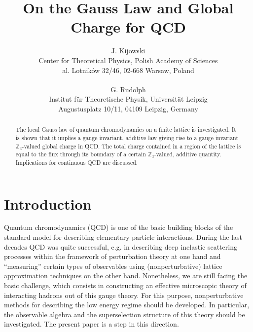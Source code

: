 \documentclass[a4paper,12pt]{article}
\begin{document}

\title{\bf On the Gauss Law and Global Charge for
QCD}

\author{
    J. Kijowski \\
    Center for Theoretical  Physics, Polish Academy of Sciences\\
    al. Lotnik\'ow 32/46, 02-668 Warsaw, Poland\\
    \ \\
    G. Rudolph \\
    Institut f\"ur Theoretische Physik, Universit\"at Leipzig\\
    Augustusplatz 10/11, 04109 Leipzig, Germany\\
    }

\maketitle



\begin{abstract}
The local Gauss law of quantum chromodynamics on a finite lattice
is investigated. It is shown that it implies a gauge invariant,
additive law giving rise to a gauge invariant ${\mathbb
Z}_3$-valued global charge in QCD. The total charge contained in a
region of the lattice is equal to the flux through its boundary of
a certain ${\mathbb Z}_3$-valued, additive quantity. Implications
for continuous QCD are discussed.
\end{abstract}

\newpage


\vspace{0.5cm}




\setcounter{equation}{0}
\section{Introduction}
Quantum chromodynamics (QCD) is one of the basic building blocks
of the standard model for describing elementary particle
interactions. During the last decades QCD was quite successful,
e.g. in describing deep inelastic scattering processes within the
framework of perturbation theory at one hand and ``measuring''
certain types of observables using (nonperturbative) lattice
approximation techniques on the other hand. Nonetheless, we are
still facing the basic challenge, which consists in constructing
an effective microscopic theory of interacting hadrons out of this
gauge theory. For this purpose, nonperturbative methods for
describing the low energy regime should be developed. In
particular, the observable algebra and the superselection
structure of this theory should be investigated. The present paper
is a step in this direction.
\end{document}
